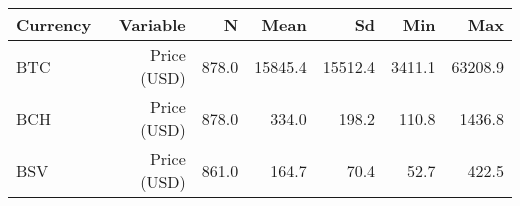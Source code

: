 
\begin{tabular}[t]{lrrrrrr}
\toprule
Currency & Variable & N & Mean & Sd & Min & Max\\
\midrule
BTC & Price (USD) & 878.0 & 15845.4 & 15512.4 & 3411.1 & 63208.9\\
BCH & Price (USD) & 878.0 & 334.0 & 198.2 & 110.8 & 1436.8\\
BSV & Price (USD) & 861.0 & 164.7 & 70.4 & 52.7 & 422.5\\
\bottomrule
\end{tabular}

